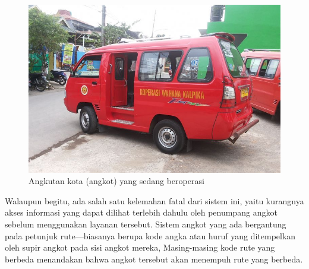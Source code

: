 \documentclass[a4paper,twoside]{article}
\begin{document}
\begin{figure}[H]
	\centering
	\includegraphics[scale=0.3]{angkot}
	\caption[Angkot yang sedang beroperasi]{Angkutan kota (angkot) yang sedang beroperasi}
	\label{fig:angkot}
\end{figure}

Walaupun begitu, ada salah satu kelemahan fatal dari sistem ini, yaitu kurangnya akses informasi yang dapat dilihat terlebih dahulu oleh penumpang angkot sebelum menggunakan layanan tersebut. Sistem angkot yang ada bergantung pada petunjuk rute---biasanya berupa kode angka atau huruf yang ditempelkan oleh supir angkot pada sisi angkot mereka, Masing-masing kode rute yang berbeda menandakan bahwa angkot tersebut akan menempuh rute yang berbeda. 

\vspace*{\fill} \newpage
\end{document}

